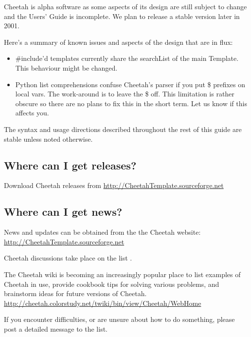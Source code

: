 Cheetah is alpha software as some aspects of its design are still subject to
change and the Users' Guide is incomplete.  We plan to release a stable version
later in 2001.

Here's a summary of known issues and aspects of the design that are in flux:
\begin{itemize}
\item \#include'd templates currently share the searchList of the main Template.
     This behaviour might be changed.
\item Python list comprehensions confuse Cheetah's parser if you put \$ prefixes
     on local vars.  The work-around is to leave the \$ off.  This limitation is
     rather obscure so there are no plans to fix this in the short term.  Let us
     know if this affects you.
\end{itemize}

The syntax and usage directions described throughout the rest of this guide are
stable unless noted otherwise.

\subsection{Where can I get releases?}
\label{intro.releases}

Download Cheetah releases from
\url{http://CheetahTemplate.sourceforge.net}

\subsection{Where can I get news?}
\label{intro.news}

News and updates can be obtained from the the Cheetah website:
\url{http://CheetahTemplate.sourceforge.net}

Cheetah discussions take place on the list
.

The Cheetah wiki is becoming an increasingly popular place to list examples of
Cheetah in use, provide cookbook tips for solving various problems, and
brainstorm ideas for future versions of Cheetah.
\url{http://cheetah.colorstudy.net/twiki/bin/view/Cheetah/WebHome}


If you encounter difficulties, or are unsure about how to do something,
please post a detailed message to the list.

